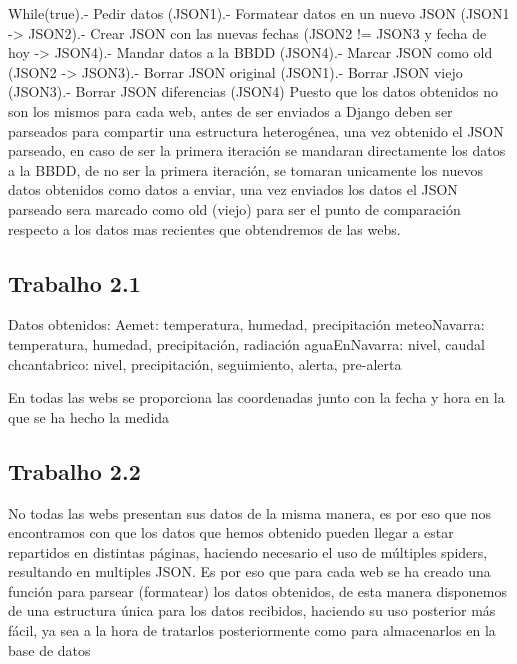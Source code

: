 While(true).- Pedir datos (JSON1).- Formatear datos en un nuevo JSON (JSON1 -> JSON2).- Crear JSON con las nuevas fechas (JSON2 != JSON3 y fecha de hoy -> JSON4).- Mandar datos a la BBDD (JSON4).- Marcar JSON como old (JSON2 -> JSON3).- Borrar JSON original (JSON1).- Borrar JSON viejo (JSON3).- Borrar JSON diferencias (JSON4)\newline
\newline
\newline
Puesto que los datos obtenidos no son los mismos para cada web, antes de ser enviados a Django deben ser parseados para compartir una estructura heterogénea, una vez obtenido el JSON parseado, en caso de ser la primera iteración se mandaran directamente los datos a la BBDD, de no ser la primera iteración, se tomaran unicamente los nuevos datos obtenidos como datos a enviar, una vez enviados los datos el JSON parseado sera marcado como old (viejo) para ser el punto de comparación respecto a los datos mas recientes que obtendremos de las webs.

\subsection{Trabalho 2.1}
Datos obtenidos:\newline
Aemet:\newline
temperatura, humedad, precipitación
\newline
meteoNavarra:\newline
temperatura, humedad, precipitación, radiación
\newline
aguaEnNavarra:\newline
nivel, caudal
\newline
chcantabrico:\newline
nivel, precipitación, seguimiento, alerta, pre-alerta

En todas las webs se proporciona las coordenadas junto con la fecha y hora en la que se ha hecho la medida

\subsection{Trabalho 2.2}
No todas las webs presentan sus datos de la misma manera, es por eso que nos encontramos con que los datos que hemos obtenido pueden llegar a estar repartidos en distintas páginas, haciendo necesario el uso de múltiples spiders, resultando en multiples JSON.
Es por eso que para cada web se ha creado una función para parsear (formatear) los datos obtenidos, de esta manera disponemos de una estructura única para los datos recibidos, haciendo su uso posterior más fácil, ya sea a la hora de tratarlos posteriormente como para almacenarlos en la base de datos

